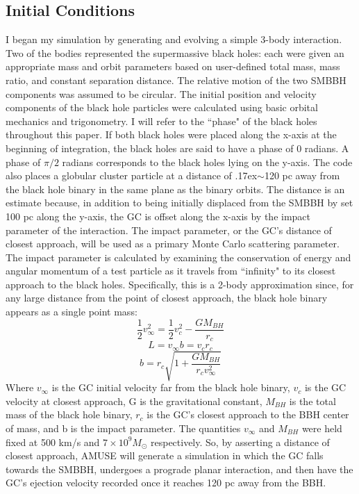 \documentclass{aastex62}
\begin{document}
\subsection{Initial Conditions}
I began my simulation by generating and evolving a simple 3-body interaction. Two of the bodies represented the supermassive black holes: each were given an appropriate mass and orbit parameters based on user-defined total mass, mass ratio, and constant separation distance. The relative motion of the two SMBBH components was assumed to be circular. The initial position and velocity components of the black hole particles were calculated using basic orbital mechanics and trigonometry. I will refer to the ``phase" of the black holes throughout this paper. If both black holes were placed along the x-axis at the beginning of integration, the black holes are said to have a phase of 0 radians. A phase of $\pi/2$ radians corresponds to the black holes lying on the y-axis. The code also places a globular cluster particle at a distance of {\raise.17ex\hbox{$\scriptstyle\mathtt{\sim}$}}120 pc away from the black hole binary in the same plane as the binary orbits. The distance is an estimate because, in addition to being initially displaced from the SMBBH by set 100 pc along the y-axis, the GC is offset along the x-axis by the impact parameter of the interaction. The impact parameter, or the GC's distance of closest approach, will be used as a primary Monte Carlo scattering parameter. The impact parameter is calculated by examining the conservation of energy and angular momentum of a test particle as it travels from ``infinity" to its closest approach to the black holes. Specifically, this is a 2-body approximation since, for any large distance from the point of closest approach, the black hole binary appears as a single point mass:
\begin{equation}
\frac{1}{2}v_{\infty}^2 = \frac{1}{2}v_{c}^2 - \frac{GM_{BH}}{r_{c}}
\end{equation}
\begin{equation}
L = v_{\infty}b = v_{c}r_{c}
\end{equation}
\begin{equation}
b = r_{c}\sqrt{1+\frac{GM_{BH}}{r_{c}v_{\infty}^2}}
\end{equation}
Where $v_{\infty}$ is the GC initial velocity far from the black hole binary, $v_{c}$ is the GC velocity at closest approach, G is the gravitational constant, $M_{BH}$ is the total mass of the black hole binary, $r_{c}$ is the GC's closest approach to the BBH center of mass, and b is the impact parameter.  The quantities $v_{\infty}$ and $M_{BH}$ were held fixed at 500 km/s and $7 \times 10^9 M_{\odot}$ respectively. So, by asserting a distance of closest approach, AMUSE will generate a simulation in which the GC falls towards the SMBBH, undergoes a prograde planar interaction, and then have the GC's ejection velocity recorded once it reaches 120 pc away from the BBH. 
\end{document}
